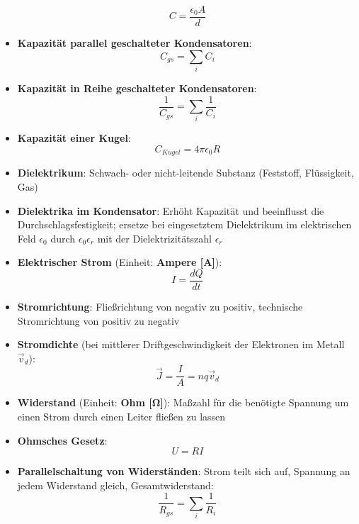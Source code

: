 \begin{itemize}
\begin{equation}
		C = \frac{\epsilon_0 A}{d}
	\end{equation}
	\item \textbf{Kapazität parallel geschalteter Kondensatoren}:
	\begin{equation}
		C_{gs} = \sum_i C_i
	\end{equation}
	\item \textbf{Kapazität in Reihe geschalteter Kondensatoren}:
	\begin{equation}
		\frac{1}{C_{gs}} = \sum_i \frac{1}{C_{i}}
	\end{equation}
	\item \textbf{Kapazität einer Kugel}:
	\begin{equation}
		C_{Kugel} = 4\pi\epsilon_0R
	\end{equation}
	\item \textbf{Dielektrikum}: Schwach- oder nicht-leitende Substanz (Feststoff, Flüssigkeit, Gas)
	\item \textbf{Dielektrika im Kondensator}: Erhöht Kapazität und beeinflusst die Durchschlagsfestigkeit; ersetze bei eingesetztem Dielektrikum im elektrischen Feld $\epsilon_0$ durch $\epsilon_0\epsilon_r$ mit der Dielektrizitätszahl $\epsilon_r$
	\item \textbf{Elektrischer Strom} (Einheit: \textbf{Ampere [A]}): 
	\begin{equation}
		I = \frac{dQ}{dt}
	\end{equation}
	\item \textbf{Stromrichtung}: Fließrichtung von negativ zu positiv, technische Stromrichtung von positiv zu negativ
	\item \textbf{Stromdichte} (bei mittlerer Driftgeschwindigkeit der Elektronen im Metall $\vec{v}_d$):
	\begin{equation}
		\vec{J} = \frac{I}{A} = nq\vec{v}_d
	\end{equation}
	\item \textbf{Widerstand} (Einheit: \textbf{Ohm [$\mathbf{\Omega}$]}): Maßzahl für die benötigte Spannung um einen Strom durch einen Leiter fließen zu lassen
	\item \textbf{Ohmsches Gesetz}:
	\begin{equation}
		U = R I
	\end{equation}
	\item \textbf{Parallelschaltung von Widerständen}: Strom teilt sich auf, Spannung an jedem Widerstand gleich, Gesamtwiderstand:
	\begin{equation}
		\frac{1}{R_{gs}} = \sum_i \frac{1}{R_i}

\end{equation}
\end{itemize}
